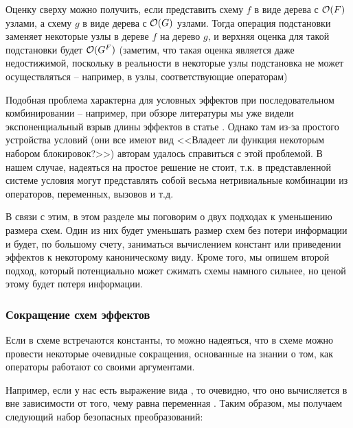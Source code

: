 Оценку сверху можно получить, если представить схему $f$ в виде дерева с $\mathcal{O}(F)$ узлами, а схему $g$ в виде дерева с $\mathcal{O}(G)$ узлами. Тогда операция подстановки заменяет некоторые узлы в дереве $f$ на дерево $g$, и верхняя оценка для такой подстановки будет $\mathcal{O}(G^F)$ (заметим, что такая оценка является даже недостижимой, поскольку в реальности в некоторые узлы подстановка не может осуществляться -- например, в узлы, соответствующие операторам)

Подобная проблема характерна для условных эффектов при последовательном комбинировании -- например, при обзоре литературы мы уже видели экспоненциальный взрыв длины эффектов в статье  \cite{Flanagan08}. Однако там из-за простого устройства условий (они все имеют вид <<Владеет ли функция некоторым набором блокировок?>>) авторам удалось справиться с этой проблемой. В нашем случае, надеяться на простое решение не стоит, т.к. в представленной системе условия могут представлять собой весьма нетривиальные комбинации из операторов, переменных, вызовов и т.д.

В связи с этим, в этом разделе мы поговорим о двух подходах к уменьшению размера схем. Один из них будет уменьшать размер схем без потери информации и будет, по большому счету, заниматься вычислением констант или приведении эффектов к некоторому каноническому виду. Кроме того, мы опишем второй подход, который потенциально может сжимать схемы намного сильнее, но ценой этому будет потеря информации. 


\subsubsection{Сокращение схем эффектов}

Если в схеме встречаются константы, то можно надеяться, что в схеме можно провести некоторые очевидные сокращения, основанные на знании о том, как операторы работают со своими аргументами.

Например, если у нас есть выражение вида , то очевидно, что оно вычисляется в  вне зависимости от того, чему равна переменная . Таким образом, мы получаем следующий набор безопасных преобразований:

